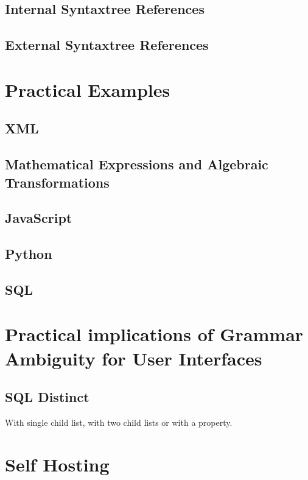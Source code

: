 \subsection{Internal Syntaxtree References}

\subsection{External Syntaxtree References}

\section{Practical Examples}

\subsection{XML}

\subsection{Mathematical Expressions and Algebraic Transformations}

\subsection{JavaScript}

\subsection{Python}

\subsection{SQL}

\section{Practical implications of Grammar Ambiguity for User Interfaces}

\subsection{SQL Distinct}

With single child list, with two child lists or with a property.

\section{Self Hosting}

